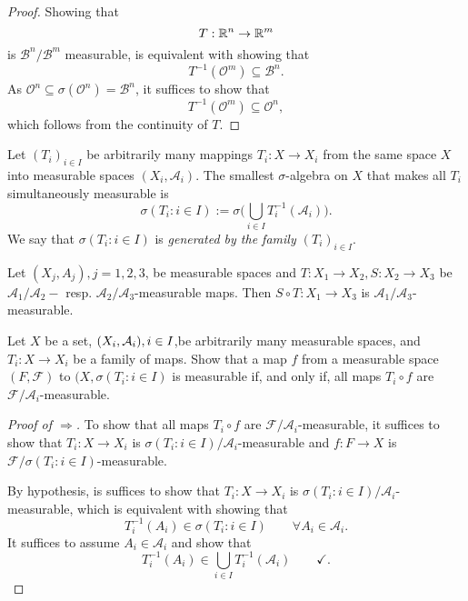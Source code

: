 \begin{proof}
Showing that
\[
T:\Bbb{R}^n\rightarrow \Bbb{R}^m
\]
is \(\mathcal{B}^n/\mathcal{B}^m\) measurable, is equivalent with showing that
\[
T^{-1}(\mathcal{O}^m)\subseteq \mathcal{B}^n.
\]
As \(\mathcal{O}^n\subseteq \sigma (\mathcal{O}^n)= \mathcal{B}^n\), it suffices to show that
\[
T^{-1}(\mathcal{O}^m)\subseteq \mathcal{O}^n,
\]
which follows from the continuity of \(T\).
\end{proof}

\begin{defn}
Let \((T_{i})_{i\in I}\) be arbitrarily many mappings \(T_{i}:X\rightarrow X_{i}\) from the same space \(X\) into measurable spaces \((X_{i},\mathcal{A}_{i})\). The smallest \(\sigma \)-algebra on \(X\) that makes all \(T_{i}\) simultaneously measurable is
\[
\sigma (T_{i}:i\in I):=\sigma \Big(\bigcup _{i\in I}T_{i}^{-1}(\mathcal{A}_{i})\Big).
\]
We say that \(\sigma (T_{i}:i\in I)\) is \emph{generated by the family \((T_{i})_{i\in I}\)}.
\end{defn}

\begin{thm}
Let \((X_{j},A_{j}),j=1,2,3\), be measurable spaces and \(T:X_{1}\rightarrow X_{2},S:X_{2}\rightarrow X_{3}\) be \(\mathcal{A}_{1}/\mathcal{A}_{2}-\) resp. \(\mathcal{A}_{2}/\mathcal{A}_{3}\)-measurable maps. Then \(S\circ T:X_{1}\rightarrow X_{3}\) is \(\mathcal{A}_{1}/\mathcal{A}_{3}\)-measurable.
\end{thm}
\newpage
\begin{thm}[Problem 7.4]
Let \(X\) be a set, \((X_{i},\mathcal{A}_{i}),\space i\in I\),be arbitrarily many measurable spaces, and \(T_{i}:X\rightarrow X_{i}\) be a family of maps. Show that a map \(f\) from a measurable space \((F,\mathcal{F})\) to \((X,\sigma (T_{i}:i\in I)\) is measurable if, and only if, all maps \(T_{i}\circ f\) are \(\mathcal{F}/\mathcal{A}_{i}\)-measurable.
\end{thm}

\begin{proof}[Proof of $\Longrightarrow$]
To show that all maps \(T_{i}\circ f\) are \(\mathcal{F}/\mathcal{A}_{i}\)-measurable, it suffices to show that \(T_{i}:X\rightarrow X_{i}\) is \(\sigma (T_{i}:i\in I)/\mathcal{A}_{i}\)-measurable and \(f:F\rightarrow X\) is \(\mathcal{F}/\sigma (T_{i}:i\in I)\)-measurable.

By hypothesis, is suffices to show that \(T_{i}:X\rightarrow X_{i}\) is \(\sigma (T_{i}:i\in I)/\mathcal{A}_{i}\)-measurable, which is equivalent with showing that
\[
T_{i}^{-1}(A_{i})\in \sigma (T_{i}:i\in I)\qquad \forall A_{i}\in \mathcal{A}_{i}.
\]
It suffices to assume \(A_{i}\in \mathcal{A}_{i}\) and show that
\[
T_{i}^{-1}(A_{i})\in \bigcup _{i\in I}T_{i}^{-1}(\mathcal{A}_{i}) \qquad \checkmark.
\]
\end{proof}

